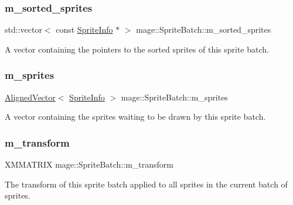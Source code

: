 \subsubsection{\texorpdfstring{m\+\_\+sorted\+\_\+sprites}{m\_sorted\_sprites}}
{\footnotesize\ttfamily std\+::vector$<$ const \hyperlink{structmage_1_1_sprite_info}{Sprite\+Info} $\ast$ $>$ mage\+::\+Sprite\+Batch\+::m\+\_\+sorted\+\_\+sprites\hspace{0.3cm}{\ttfamily [private]}}

A vector containing the pointers to the sorted sprites of this sprite batch. \hypertarget{classmage_1_1_sprite_batch_ace7cf236fb990688d6482631d70f43d9}{}\label{classmage_1_1_sprite_batch_ace7cf236fb990688d6482631d70f43d9} 
\subsubsection{\texorpdfstring{m\+\_\+sprites}{m\_sprites}}
{\footnotesize\ttfamily \hyperlink{namespacemage_a8664bfb5ce2179fc64eae9f82c8a5ba8}{Aligned\+Vector}$<$ \hyperlink{structmage_1_1_sprite_info}{Sprite\+Info} $>$ mage\+::\+Sprite\+Batch\+::m\+\_\+sprites\hspace{0.3cm}{\ttfamily [private]}}

A vector containing the sprites waiting to be drawn by this sprite batch. \hypertarget{classmage_1_1_sprite_batch_ad8a12f1f6c8289548346d469c9436c58}{}\label{classmage_1_1_sprite_batch_ad8a12f1f6c8289548346d469c9436c58} 
\subsubsection{\texorpdfstring{m\+\_\+transform}{m\_transform}}
{\footnotesize\ttfamily X\+M\+M\+A\+T\+R\+IX mage\+::\+Sprite\+Batch\+::m\+\_\+transform\hspace{0.3cm}{\ttfamily [private]}}

The transform of this sprite batch applied to all sprites in the current batch of sprites. \hypertarget{classmage_1_1_sprite_batch_ac8ff5a2d9956b4a33cb1f41310abf129}{}\label{classmage_1_1_sprite_batch_ac8ff5a2d9956b4a33cb1f41310abf129} 
